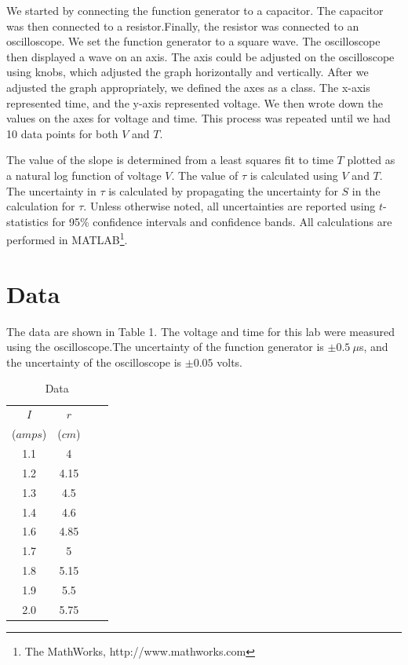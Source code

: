 \documentclass[onecolumn]{article}
\begin{document}
We started by connecting the function generator to a capacitor. The capacitor was then connected to a resistor.Finally, the resistor was connected to an oscilloscope. We set the function generator to a square wave. The oscilloscope then displayed a wave on an axis. The axis could be adjusted on the oscilloscope using knobs, which adjusted the graph horizontally and vertically. After we adjusted the graph appropriately, we defined the axes as a class. The x-axis represented time, and the y-axis represented voltage. We then wrote down the values on the axes for voltage and time. This process was repeated until we had 10 data points for both $V$ and $T$.

The value of the slope is determined from a least squares fit to time $T$ plotted as a natural log function of voltage $V$. The value of $\tau$ is calculated using $V$ and $T$. The uncertainty in $\tau$ is calculated by propagating the uncertainty for $S$ in the calculation for $\tau$. Unless otherwise noted, all uncertainties are reported using $t$-statistics for 95\% confidence intervals and confidence bands. All calculations are performed in MATLAB\footnote{The MathWorks, http://www.mathworks.com}.

\section*{Data}

The data are shown in Table 1. The voltage and time for this lab were measured using the oscilloscope.The uncertainty of the function generator is $\pm0.5~\mu$s, and the uncertainty of the oscilloscope is $\pm0.05$ volts.

\begin{table}[htbp!]
\centering
\caption{Data}
\begin{tabular}{cccc}
\hline\hline
$I$ & $r$ \\
($amps$) & ($cm$) \\
\hline
1.1 & 4 \\
1.2 & 4.15 \\
1.3 & 4.5 \\
1.4 & 4.6 \\
1.6 & 4.85 \\
1.7 & 5 \\
1.8 & 5.15 \\
1.9 & 5.5 \\
2.0 & 5.75 \\
\hline
\end{tabular}
\end{table}
\end{document}
